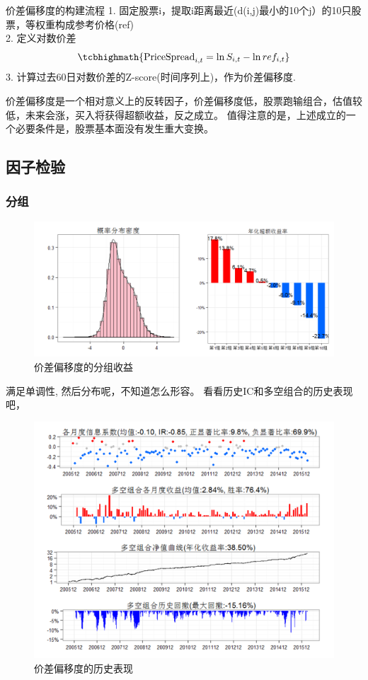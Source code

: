 \documentclass[12pt]{article}
\begin{document}
\begin{sconclude}{价差偏移度的构建流程}{}
1. 固定股票i，提取i距离最近(d(i,j)最小的10个j）的10只股票，等权重构成参考价格(ref)\\
2. 定义对数价差 $$ \tcbhighmath{\text{PriceSpread}_{i,t}=\ln{S_{i,t}}-\ln{ref_{i,t}}}$$ 
3. 计算过去60日对数价差的Z-score(时间序列上)，作为价差偏移度.

\end{sconclude}
\begin{sremark}{}{}
价差偏移度是一个相对意义上的反转因子，价差偏移度低，股票跑输组合，估值较低，未来会涨，买入将获得超额收益，反之成立。 值得注意的是，上述成立的一个必要条件是，股票基本面没有发生重大变换。
\end{sremark}


\subsection{因子检验}
\subsubsection{分组}
\begin{figure}[htb]
	\centering
	\includegraphics[scale=0.45]{figure/价差偏移度_分组.png}
	\caption{价差偏移度的分组收益}
\end{figure}
满足单调性, 然后分布呢，不知道怎么形容。
看看历史IC和多空组合的历史表现吧，
\begin{figure}[htb]
	\centering
	\includegraphics[scale=0.7]{figure/价差偏离度_历史表现.png}
	\caption{价差偏移度的历史表现}
\end{figure}
\end{document}
